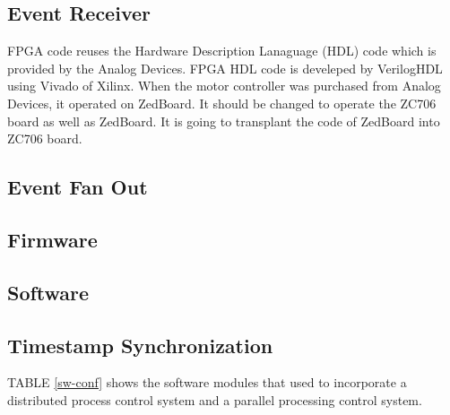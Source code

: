 \documentclass[journal]{IEEEtran}
\begin{document}
\subsection{Event Receiver}
FPGA code reuses the Hardware Description Lanaguage (HDL) code which is provided by the Analog Devices. FPGA HDL code is develeped by VerilogHDL using Vivado of Xilinx. When the motor controller was purchased from Analog Devices, it operated on ZedBoard. It should be changed to operate the ZC706 board as well as ZedBoard. It is going to transplant the code of ZedBoard into ZC706 board.


\subsection{Event Fan Out}

\subsection{Firmware}

\subsection{Software}

\subsection{Timestamp Synchronization}


\hfill\break
TABLE \ref{sw-conf} shows the software modules that used to incorporate a distributed process control system and a parallel processing control system.
\end{document}
